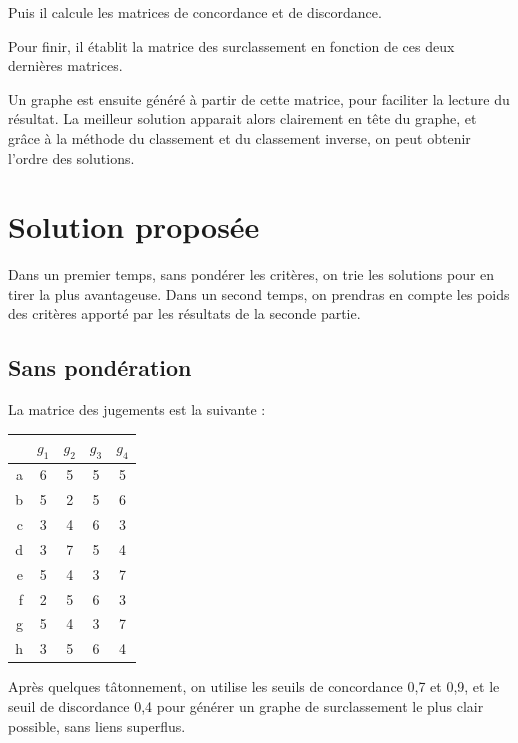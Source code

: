 
Puis il calcule les matrices de concordance et de discordance.



Pour finir, il établit la matrice des surclassement en fonction de ces deux dernières matrices.


Un graphe est ensuite généré à partir de cette matrice, pour faciliter la lecture du résultat.
La meilleur solution apparait alors clairement en tête du graphe, et grâce à la méthode du classement et du classement inverse, on peut obtenir l'ordre des solutions.

\section{Solution proposée}

Dans un premier temps, sans pondérer les critères, on trie les solutions pour en tirer la plus avantageuse. Dans un second temps, on prendras en compte les poids des critères apporté par les résultats de la seconde partie.

\subsection{Sans pondération}

La matrice des jugements est la suivante :
\begin{tabular}{r | c c c c}
~ & $g_1$ & $g_2$ & $g_3$ & $g_4$ \\ \hline
a & 6 & 5 & 5 & 5 \\
b & 5 & 2 & 5 & 6 \\
c & 3 & 4 & 6 & 3 \\
d & 3 & 7 & 5 & 4 \\
e & 5 & 4 & 3 & 7 \\
f & 2 & 5 & 6 & 3 \\
g & 5 & 4 & 3 & 7 \\
h & 3 & 5 & 6 & 4 \\
\end{tabular}

Après quelques tâtonnement, on utilise les seuils de concordance 0,7 et 0,9, et le seuil de discordance 0,4 pour générer un graphe de surclassement le plus clair possible, sans liens superflus.

\clearpage

